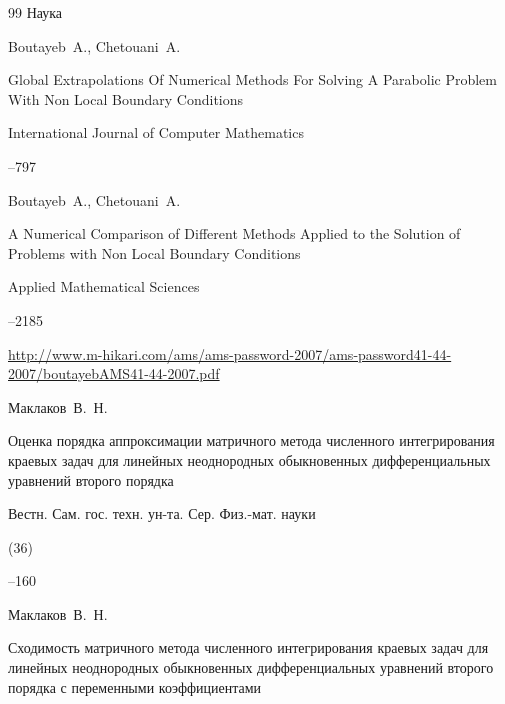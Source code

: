 \begin{thebibliography}{99}
\publ Наука






\by Boutayeb~A., Chetouani~A.

\paper Global Extrapolations Of Numerical Methods For Solving A Parabolic Problem With Non Local Boundary Conditions

\jour International Journal of Computer Mathematics



--797






\by Boutayeb~A., Chetouani~A.

\paper A Numerical Comparison of Different Methods Applied to the Solution of Problems with Non Local Boundary Conditions

\jour Applied Mathematical Sciences




--2185

\elink \url{http://www.m-hikari.com/ams/ams-password-2007/ams-password41-44-2007/boutayebAMS41-44-2007.pdf}






\by Маклаков~В.~Н.

\paper Оценка порядка аппроксимации матричного метода численного интегрирования краевых задач для линейных неоднородных обыкновенных дифференциальных уравнений второго порядка

\jour Вестн. Сам. гос. техн. ун-та. Сер. Физ.-мат. науки


(36)

--160





\by Маклаков~В.~Н.

\paper Сходимость матричного метода численного интегрирования краевых задач для линейных неоднородных обыкновенных дифференциальных уравнений второго порядка с переменными коэффициентами


\end{thebibliography}
